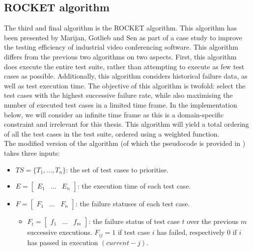 
\subsection{ROCKET algorithm}
\label{ssec:alg-rocket}

The third and final algorithm is the ROCKET algorithm. This algorithm has been presented by Marijan, Gotlieb and Sen \cite{6676952} as part of a case study to improve the testing efficiency of industrial video conferencing software. This algorithm differs from the previous two algorithms on two aspects. First, this algorithm does execute the entire test suite, rather than attempting to execute as few test cases as possible. Additionally, this algorithm considers historical failure data, as well as test execution time. The objective of this algorithm is twofold: select the test cases with the highest successive failure rate, while also maximising the number of executed test cases in a limited time frame. In the implementation below, we will consider an infinite time frame as this is a domain-specific constraint and irrelevant for this thesis. This algorithm will yield a total ordering of all the test cases in the test suite, ordered using a weighted function.\\

\noindent The modified version of the algorithm (of which the pseudocode is provided in ) takes three inputs:
\begin{itemize}
	\item $TS = \{T_1, \dots, T_n\}$: the set of test cases to prioritise.
	\item $E = \begin{bmatrix}
		E_1 & \dots & E_n
	\end{bmatrix}$: the execution time of each test case.
	\item $F = \begin{bmatrix}
		F_1 & \dots & F_n
	\end{bmatrix}$: the failure statuses of each test case.
		\begin{itemize}
			\item $F_t = \begin{bmatrix}
				f_1 & \dots & f_m
			\end{bmatrix}$: the failure status of test case $t$ over the previous $m$ successive executions. $F_{ij} = 1$ if test case $i$ has failed, respectively $0$ if $i$ has passed in execution $(current - j)$.
		\end{itemize}
\end{itemize}

